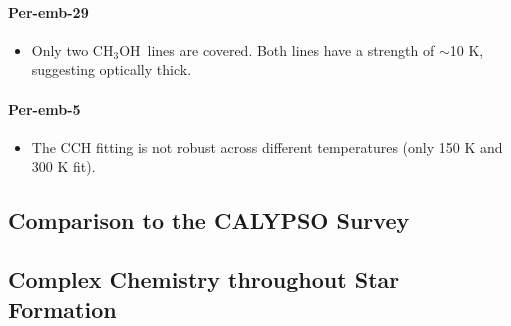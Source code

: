 \documentclass[twocolumn]{aastex62}
\newcommand{\kms}{\mbox{\,km\,s$^{-1}$}}
\newcommand{\jj}[2]{\mbox{$J = #1\rightarrow#2$}}
\newcommand{\methanol}{\mbox{CH$_{3}$OH}}
\newcommand{\sosigma}{\mbox{SO\,$^{3}\Sigma$}}
\begin{document}
\paragraph{Per-emb-29}
\begin{itemize}
  \item Only two \methanol\ lines are covered.  Both lines have a strength of $\sim$10 K, suggesting optically thick.
\end{itemize}

\paragraph{Per-emb-5}
\begin{itemize}
  \item The CCH fitting is not robust across different temperatures (only 150 K and 300 K fit).
\end{itemize}


\subsection{Comparison to the CALYPSO Survey}
\subsection{Complex Chemistry throughout Star Formation}


\end{document}
